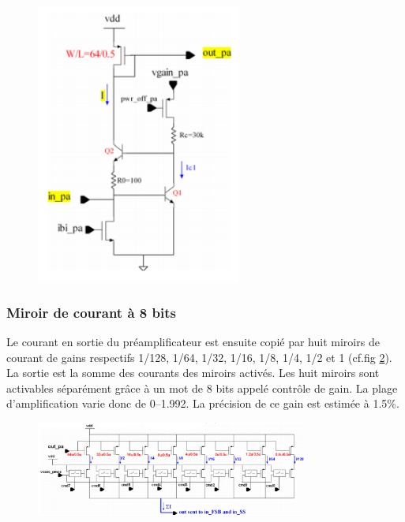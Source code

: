 \begin{figure}[th!]
	\centering
	\includegraphics[width=0.60\textwidth]{GLA/preampli.png}
	\label{preampli}
\end{figure}

\subsubsection{Miroir de courant à 8 bits}
Le courant en sortie du préamplificateur est ensuite copié par huit miroirs de courant de gains respectifs 1/128, 1/64, 1/32, 1/16, 1/8, 1/4, 1/2 et 1 (cf.fig \ref{mirror}). La sortie est la somme des courants des miroirs activés. Les huit miroirs sont activables séparément grâce à un mot de \num{8} bits appelé contrôle de gain. La plage d'amplification varie donc de \SIrange{0}{1.992}{}. La précision de ce gain est estimée à 1.5\%. 

\begin{figure}[ht!]
	\centering
	\includegraphics[width=0.8\textwidth]{GLA/miror.png}
	\label{mirror}
\end{figure}

